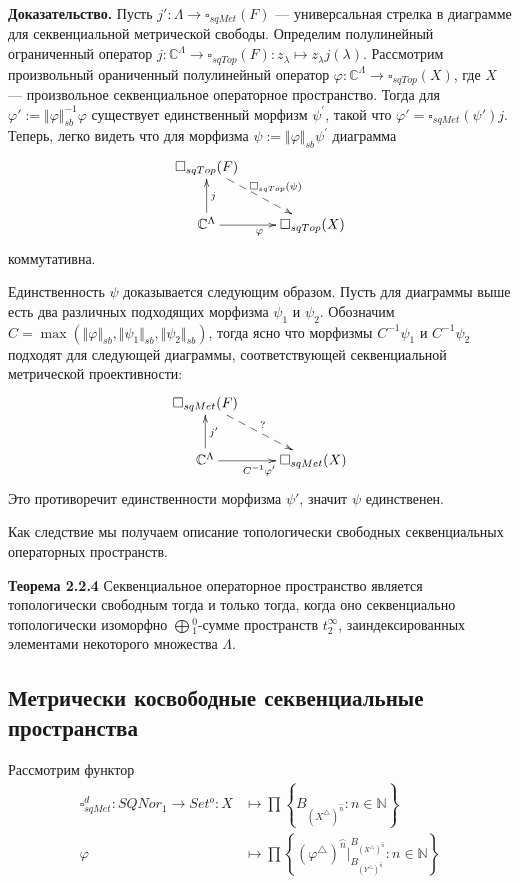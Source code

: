 \documentclass[12pt]{article}
\begin{document}
{\bf Доказательство.} Пусть $j':\Lambda\to \square_{sqMet}(F)$ --- универсальная
стрелка в диаграмме для секвенциальной метрической свободы. Определим
полулинейный ограниченный оператор $j: \mathbb{C}^{\Lambda} \to
\square_{sqTop}(F): z_\lambda\mapsto z_\lambda j(\lambda)$. Рассмотрим
произвольный ораниченный полулинейный оператор $\varphi : \mathbb{C}^{\Lambda}
\to \square_{sqTop}(X)$, где $X$ --- произвольное секвенциальное операторное
пространство.  Тогда для $\varphi':=\Vert \varphi \Vert_{sb}^{-1}\varphi $
существует единственный морфизм $\psi^{'}$, такой что
$\varphi'=\square_{sqMet}(\psi')j$. Теперь, легко видеть что для морфизма
$\psi:=\Vert \varphi \Vert_{sb} \psi^{'}$ диаграмма
$$
\xymatrix{
{\square_{sqTop}(F)}
\ar@{-->}[dr]^{\square_{sqTop}(\psi)} & \\  %
{\mathbb{C}^{\Lambda}}\ar[u]_{j}  %
\ar[r]_{\varphi}  &{\square_{sqTop}(X)} }  %
$$
коммутативна.
	
Единственность $\psi$ доказывается следующим образом. Пусть для диаграммы выше
есть два различных подходящих морфизма $\psi_1$ и $\psi_2$. Обозначим $C=\max(
\Vert \varphi\Vert_{sb}, \Vert \psi_1 \Vert_{sb}, \Vert \psi_2\Vert_{sb})$,
тогда ясно что морфизмы $C^{-1}\psi_1$ и $C^{-1}\psi_2$ подходят для следующей
диаграммы, соответствующей секвенциальной метрической проективности:
$$
\xymatrix{
{\square_{sqMet}(F)}
\ar@{-->}[dr]^{?} & \\  %
{\mathbb{C}^\Lambda}\ar[u]_{j'}  %
\ar[r]_{ C^{-1}\varphi'}  &{\square_{sqMet}(X)} }  %
$$
Это противоречит единственности морфизма $\psi'$, значит $\psi$ единственен.

\medskip

Как следствие мы получаем описание топологически свободных секвенциальных
операторных пространств.

{\bf Теорема 2.2.4} Секвенциальное операторное пространство является
топологически свободным тогда и только тогда, когда оно секвенциально
топологически изоморфно $\bigoplus{}_1^0$-сумме пространств $t_2^\infty$,
заиндексированных элементами некоторого множества $\Lambda$.


\subsection{Метрически косвободные секвенциальные пространства}

Рассмотрим функтор 
$$
\begin{aligned}
\square_{sqMet}^d 
: SQNor_1 \to Set^o
: X &\mapsto \prod \left \{
    B_{{(X^\triangle)}^{\wideparen{n}}}:n\in\mathbb{N}
\right \} \\
\varphi&\mapsto\prod\left \{ 
    {(\varphi^\triangle)}^{\wideparen{n}}|_{
        B_{{(Y^\triangle)}^{\wideparen{n}}}
    }^{
        B_{{(X^\triangle)}^{\wideparen{n}}}
    }
    :n\in\mathbb{N}
\right \} \\
\end{aligned}
$$
\end{document}
